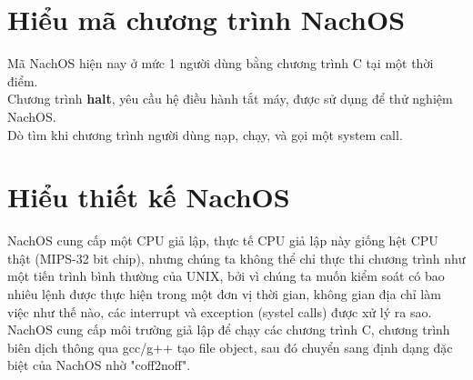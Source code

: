 \section{Hiểu mã chương trình NachOS}
Mã NachOS hiện nay ở mức 1 người dùng bằng chương trình C tại một thời điểm.\\
Chương trình \textbf{halt}, yêu cầu hệ điều hành tắt máy, được sử dụng để thử nghiệm NachOS.\\
Dò tìm khi chương trình người dùng nạp, chạy, và gọi một system call.

\section{Hiểu thiết kế NachOS}
NachOS cung cấp một CPU giả lập, thực tế CPU giả lập này giống hệt CPU thật (MIPS-32 bit chip), nhưng chúng ta không thể chỉ thực thi chương trình như một tiến trình bình thường của UNIX, bởi vì chúng ta muốn kiểm soát có bao nhiêu lệnh được thực hiện trong một đơn vị thời gian, không gian địa chỉ làm việc như thế nào, các interrupt và exception (systel calls) được xử lý ra sao.\\
NachOS cung cấp môi trường giả lập để chạy các chương trình C, chương trình biên dịch thông qua gcc/g++ tạo file object, sau đó chuyển sang định dạng đặc biệt của NachOS nhờ "coff2noff".
